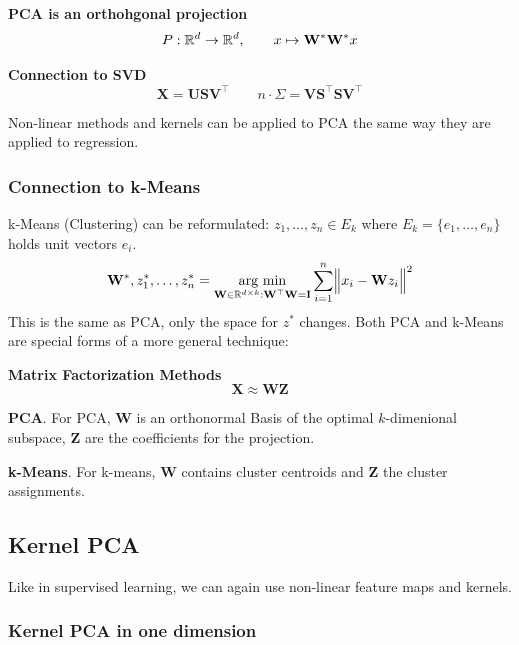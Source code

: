 \lemma \textbf{PCA is an orthohgonal projection} 
$$
    P: \mathbb{R}^d\to\mathbb{R}^d,\qquad x \mapsto \mathbf{W}^*\mathbf{W}^*x
$$

\lemma \textbf{Connection to SVD}\\
$$
    \mathbf{X} = \mathbf{USV}^\top \qquad n\cdot\Sigma = \mathbf{VS}^\top \mathbf{SV}^\top
$$

{\footnotesize
    \remark Non-linear methods and kernels can be applied to PCA the same way they are applied to regression.
}

\newpage 
\subsubsection{Connection to k-Means}

k-Means (Clustering) can be reformulated: $z_1,\ldots,z_n \in E_k$ where $E_k = \{e_1,\ldots,e_n\}$ holds unit vectors $e_i$.
$$
    \mathbf{W}^*,z_1^*,\ldots,z_n^* = \underset{\mathbf{W}\in\mathbb{R}^{d\times k}: \mathbf{W}^\top\mathbf{W}=\mathbf{I}}{\text{arg min}} \sum_{i=1}^{n} \Bigl\Vert x_i - \mathbf{W}z_i \Bigr\Vert^2
$$
This is the same as PCA, only the space for $z^*$ changes. Both PCA and k-Means are special forms of a more general technique:

 \textbf{Matrix Factorization Methods}\\
$$
    \mathbf{X} \approx \mathbf{WZ}
$$

{\footnotesize
    \remark \textbf{PCA}. For PCA, $\mathbf{W}$ is an orthonormal Basis of the optimal $k$-dimenional subspace, $\mathbf{Z}$ are the coefficients for the projection.

    \remark \textbf{k-Means}. For k-means, $\mathbf{W}$ contains cluster centroids and $\mathbf{Z}$ the cluster assignments.
}
\subsection{Kernel PCA}

Like in supervised learning, we can again use non-linear feature maps and kernels.\\

\subsubsection{Kernel PCA in one dimension}

